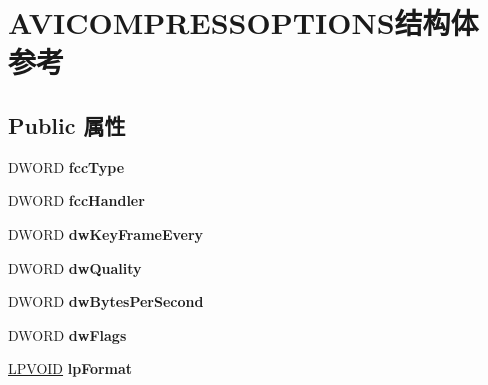 \hypertarget{struct_a_v_i_c_o_m_p_r_e_s_s_o_p_t_i_o_n_s}{}\section{A\+V\+I\+C\+O\+M\+P\+R\+E\+S\+S\+O\+P\+T\+I\+O\+N\+S结构体 参考}
\label{struct_a_v_i_c_o_m_p_r_e_s_s_o_p_t_i_o_n_s}
\subsection*{Public 属性}
\begin{DoxyCompactItemize}
\item 
\mbox{\label{struct_a_v_i_c_o_m_p_r_e_s_s_o_p_t_i_o_n_s_ad045d1f50417a0655893f1d81dd3431b}} 
D\+W\+O\+RD {\bfseries fcc\+Type}
\item 
\mbox{\label{struct_a_v_i_c_o_m_p_r_e_s_s_o_p_t_i_o_n_s_ad1db663cb029b01f381dc4dd393a25fe}} 
D\+W\+O\+RD {\bfseries fcc\+Handler}
\item 
\mbox{\label{struct_a_v_i_c_o_m_p_r_e_s_s_o_p_t_i_o_n_s_a6562ef30472faae6b9a99dde33d5ac3b}} 
D\+W\+O\+RD {\bfseries dw\+Key\+Frame\+Every}
\item 
\mbox{\label{struct_a_v_i_c_o_m_p_r_e_s_s_o_p_t_i_o_n_s_a1d8bc516347e16804b6276f0d818d2e0}} 
D\+W\+O\+RD {\bfseries dw\+Quality}
\item 
\mbox{\label{struct_a_v_i_c_o_m_p_r_e_s_s_o_p_t_i_o_n_s_a3ead254a854b2c37ea79af9593e26267}} 
D\+W\+O\+RD {\bfseries dw\+Bytes\+Per\+Second}
\item 
\mbox{\label{struct_a_v_i_c_o_m_p_r_e_s_s_o_p_t_i_o_n_s_a5a3375e0e7535058f0de2dc89153fdc5}} 
D\+W\+O\+RD {\bfseries dw\+Flags}
\item 
\mbox{\label{struct_a_v_i_c_o_m_p_r_e_s_s_o_p_t_i_o_n_s_af6b1bb887b296605864055b5056c18d3}} 
\hyperlink{interfacevoid}{L\+P\+V\+O\+ID} {\bfseries lp\+Format}

\end{DoxyCompactItemize}

